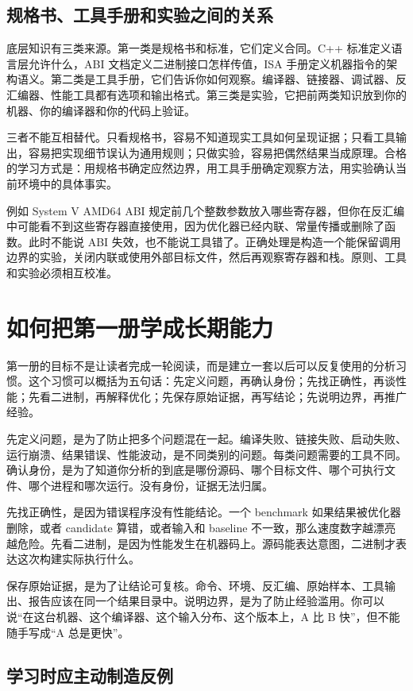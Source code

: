 \subsection{规格书、工具手册和实验之间的关系}

底层知识有三类来源。第一类是规格书和标准，它们定义合同。C++ 标准定义语言层允许什么，ABI 文档定义二进制接口怎样传值，ISA 手册定义机器指令的架构语义。第二类是工具手册，它们告诉你如何观察。编译器、链接器、调试器、反汇编器、性能工具都有选项和输出格式。第三类是实验，它把前两类知识放到你的机器、你的编译器和你的代码上验证。

三者不能互相替代。只看规格书，容易不知道现实工具如何呈现证据；只看工具输出，容易把实现细节误认为通用规则；只做实验，容易把偶然结果当成原理。合格的学习方式是：用规格书确定应然边界，用工具手册确定观察方法，用实验确认当前环境中的具体事实。

例如 System V AMD64 ABI 规定前几个整数参数放入哪些寄存器，但你在反汇编中可能看不到这些寄存器直接使用，因为优化器已经内联、常量传播或删除了函数。此时不能说 ABI 失效，也不能说工具错了。正确处理是构造一个能保留调用边界的实验，关闭内联或使用外部目标文件，然后再观察寄存器和栈。原则、工具和实验必须相互校准。

\section{如何把第一册学成长期能力}

第一册的目标不是让读者完成一轮阅读，而是建立一套以后可以反复使用的分析习惯。这个习惯可以概括为五句话：先定义问题，再确认身份；先找正确性，再谈性能；先看二进制，再解释优化；先保存原始证据，再写结论；先说明边界，再推广经验。

先定义问题，是为了防止把多个问题混在一起。编译失败、链接失败、启动失败、运行崩溃、结果错误、性能波动，是不同类别的问题。每类问题需要的工具不同。确认身份，是为了知道你分析的到底是哪份源码、哪个目标文件、哪个可执行文件、哪个进程和哪次运行。没有身份，证据无法归属。

先找正确性，是因为错误程序没有性能结论。一个 benchmark 如果结果被优化器删除，或者 candidate 算错，或者输入和 baseline 不一致，那么速度数字越漂亮越危险。先看二进制，是因为性能发生在机器码上。源码能表达意图，二进制才表达这次构建实际执行什么。

保存原始证据，是为了让结论可复核。命令、环境、反汇编、原始样本、工具输出、报告应该在同一个结果目录中。说明边界，是为了防止经验滥用。你可以说“在这台机器、这个编译器、这个输入分布、这个版本上，A 比 B 快”，但不能随手写成“A 总是更快”。

\subsection{学习时应主动制造反例}

